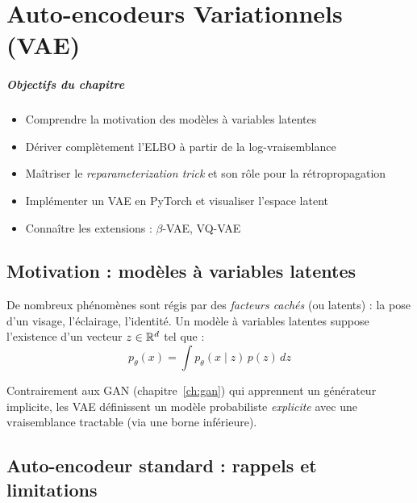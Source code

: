 \chapter{Auto-encodeurs Variationnels (VAE)}
\label{ch:vae}

\paragraph{Objectifs du chapitre}
\begin{itemize}
\item Comprendre la motivation des mod\`eles \`a variables latentes
\item D\'eriver compl\`etement l'ELBO \`a partir de la log-vraisemblance
\item Ma\^itriser le \emph{reparameterization trick} et son r\^ole pour la r\'etropropagation
\item Impl\'ementer un VAE en PyTorch et visualiser l'espace latent
\item Conna\^itre les extensions : $\beta$-VAE, VQ-VAE
\end{itemize}

\section{Motivation : mod\`eles \`a variables latentes}
\label{sec:vae-motivation}

De nombreux ph\'enom\`enes sont r\'egis par des \emph{facteurs cach\'es} (ou latents) : la pose d'un visage, l'\'eclairage, l'identit\'e. Un mod\`ele \`a variables latentes suppose l'existence d'un vecteur $z \in \mathbb{R}^d$ tel que :
\begin{equation}
p_\theta(x) = \int p_\theta(x \mid z)\, p(z)\, dz
\label{eq:marginal-likelihood}
\end{equation}

\begin{remarque}
Contrairement aux GAN (chapitre~\ref{ch:gan}) qui apprennent un g\'en\'erateur implicite, les VAE d\'efinissent un mod\`ele probabiliste \emph{explicite} avec une vraisemblance tractable (via une borne inf\'erieure).
\end{remarque}

\section{Auto-encodeur standard : rappels et limitations}
\label{sec:autoencoder-standard}

